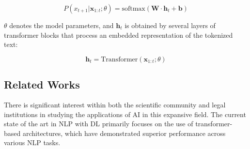 \documentclass[runningheads]{llncs}
\begin{document}
\begin{equation}
  \label{eq:llm-def}
P(x_{t+1} | \mathbf{x}_{1:t}; \theta) = \text{softmax}(\mathbf{W} \cdot \mathbf{h}_t + \mathbf{b})
\end{equation}

$\theta$ denotes the model parameters, and $\mathbf{h}_t$ is obtained
by several layers of transformer blocks that process an embedded
representation of the tokenized text:

\begin{equation}
\mathbf{h}_t = \text{Transformer}(\mathbf{x}_{1:t}; \theta)
\end{equation}
\subsection{Related Works}
\label{sec:related-works}

There is significant interest within both the scientific community
and legal institutions in studying the applications of AI in this
expansive field. The current state of the art in NLP with DL primarily
focuses on the use of transformer-based architectures, which have
demonstrated superior performance across various NLP tasks.
\end{document}
